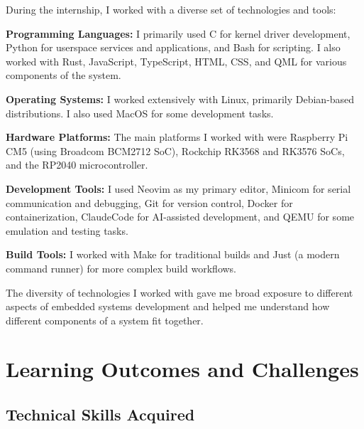 \documentclass[12pt,a4paper]{report}
\begin{document}
During the internship, I worked with a diverse set of technologies and tools:

\vspace{0.3cm}

\textbf{Programming Languages:} I primarily used C for kernel driver development, Python for userspace services and applications, and Bash for scripting. I also worked with Rust, JavaScript, TypeScript, HTML, CSS, and QML for various components of the system.

\vspace{0.3cm}

\textbf{Operating Systems:} I worked extensively with Linux, primarily Debian-based distributions. I also used MacOS for some development tasks.

\vspace{0.3cm}

\textbf{Hardware Platforms:} The main platforms I worked with were Raspberry Pi CM5 (using Broadcom BCM2712 SoC), Rockchip RK3568 and RK3576 SoCs, and the RP2040 microcontroller.

\vspace{0.3cm}

\textbf{Development Tools:} I used Neovim as my primary editor, Minicom for serial communication and debugging, Git for version control, Docker for containerization, ClaudeCode for AI-assisted development, and QEMU for some emulation and testing tasks.

\vspace{0.3cm}

\textbf{Build Tools:} I worked with Make for traditional builds and Just (a modern command runner) for more complex build workflows.

\vspace{0.3cm}

The diversity of technologies I worked with gave me broad exposure to different aspects of embedded systems development and helped me understand how different components of a system fit together.

\chapter{Learning Outcomes and Challenges}

\section{Technical Skills Acquired}
\end{document}
